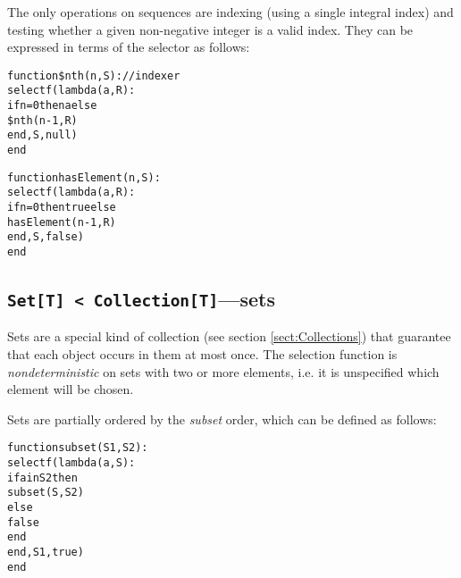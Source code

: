 
The only operations on sequences are
indexing (using a single integral index) and testing whether a given
non-negative integer is a valid index. They can be expressed in terms
of the selector as follows:
\begin{alltt}function \$nth(n, S) : // indexer
    selectf(lambda (a, R) :
                if n = 0 then a else
                    \$nth(n - 1, R)
                end, S, null)
end

function hasElement (n, S) :
    selectf(lambda (a, R) :
                if n = 0 then true else
                    hasElement(n - 1, R)
                end, S, false)
end
\end{alltt}




\subsection{{\tt Set[T] < Collection[T]}---sets}\label{sect:Sets}



Sets are a special kind of collection (see section
\ref{sect:Collections}) that guarantee that each object occurs in them
at most once. The selection function  is {\em nondeterministic} on sets with two
or more elements, i.e. it is unspecified which element will be chosen.


Sets are partially ordered by
the {\em subset} order, which can be defined as follows:
\begin{alltt}function subset(S1, S2) :
    selectf(lambda (a, S) :
                if a in S2 then
                    subset(S, S2)
                else
                    false
                end
            end, S1, true)
end\end{alltt}

